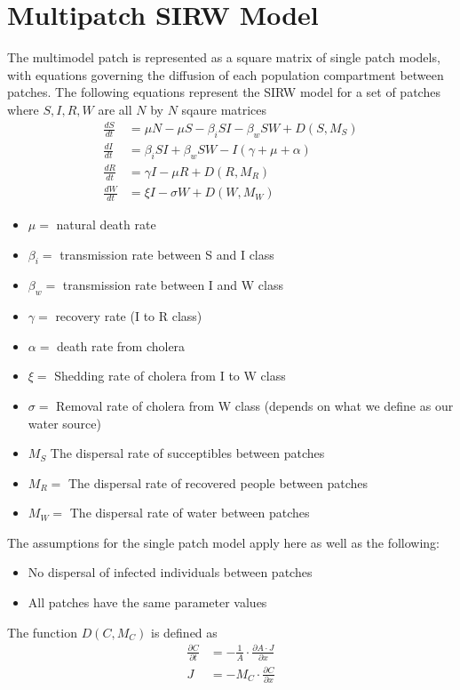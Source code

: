 \documentclass[12pt]{article}\usepackage[]{graphicx}\usepackage[]{color}
\begin{document}
\section{Multipatch SIRW Model}

The multimodel patch is represented as a square matrix of single patch models, with equations governing the diffusion of each population compartment between patches.
The following equations represent the SIRW model for a set of patches where $S,I,R,W$ are all $N$ by $N$ sqaure matrices
\begin{align*}
    \frac{dS}{dt}&= \mu N - \mu S - \beta_i S I - \beta_w S W + D(S,M_S)\\
    \frac{dI}{dt}&= \beta_i S I + \beta_w S W - I(\gamma + \mu + \alpha)\\
    \frac{dR}{dt}&= \gamma I - \mu R  + D(R,M_R) \\
    \frac{dW}{dt}&= \xi I - \sigma W + D(W,M_W)
\end{align*}
\begin{itemize}
    \item$\mu=$ natural death rate
    \item$\beta_i=$ transmission rate between S and I class
    \item$\beta_w=$ transmission rate between I and W class
    \item$\gamma=$ recovery rate (I to R class)
    \item$\alpha=$ death rate from cholera
    \item$\xi=$ Shedding rate of cholera from I to W class
    \item$\sigma=$	Removal rate of cholera from W class (depends on what we define as our water source)
    \item$M_S$ The dispersal rate of succeptibles between patches
    \item$M_R=$ The dispersal rate of recovered people between patches
    \item$M_W=$ The dispersal rate of water between patches
\end{itemize}
The assumptions for the single patch model apply here as well as the following:
\begin{itemize}
    \item No dispersal of infected individuals between patches
    \item All patches have the same parameter values
\end{itemize}
The function $D(C,M_C)$ is defined as
\begin{align*}
    \frac{\partial C}{\partial t} &= -\frac{1}{A} \cdot \frac{\partial A \cdot J}{\partial x}\\
    J &= - M_C \cdot \frac{\partial C}{\partial x}
\end{align*}
\end{document}
